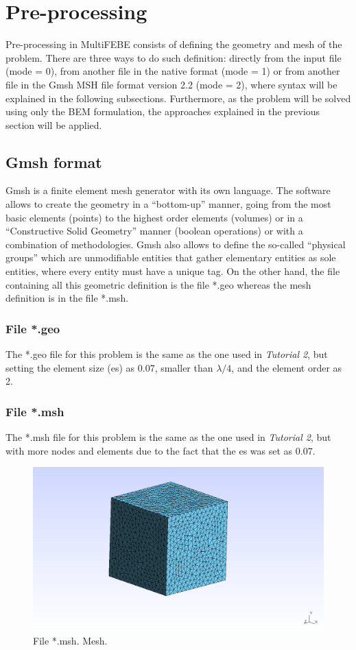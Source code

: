 \documentclass[a4]{article}
\begin{document}
\section{Pre-processing} 
Pre-processing in MultiFEBE consists of defining the geometry and mesh of the problem. There are three ways to do such definition: directly from the input file (mode = 0), from another file in the native format (mode = 1) or from another file in the Gmsh MSH file format version 2.2 (mode = 2), where syntax will be explained in the following subsections. Furthermore, as the problem will be solved using only the BEM formulation, the approaches explained in the previous section will be applied.      

\subsection{Gmsh format}
Gmsh \cite{gmsh, gmshweb} is a finite element mesh generator with its own language. The software allows to create the geometry in a “bottom-up” manner, going from the most basic elements (points) to the highest order elements (volumes) or in a “Constructive Solid Geometry” manner (boolean operations) or with a combination of methodologies. Gmsh also allows to define  the so-called “physical groups” which are unmodifiable entities that gather elementary entities as sole entities, where every entity must have a unique tag. On the other hand, the file containing all this geometric definition is the file *.geo whereas the mesh definition is in the file *.msh. 

\subsubsection{File *.geo}
The *.geo file for this problem is the same as the one used in \emph{Tutorial 2}, but setting the element size (es) as 0.07, smaller than $\lambda/4$, and the element order as 2.

\subsubsection{File *.msh}
The *.msh file for this problem is the same as the one used in \emph{Tutorial 2}, but with more nodes and elements due to the fact that the es was set as 0.07.

\begin{figure}[h]
	\centering
	\includegraphics[scale = 0.3]{mesh.png}
	\caption{File *.msh. Mesh.}
	\label{fig:mesh}
\end{figure}
\end{document}
